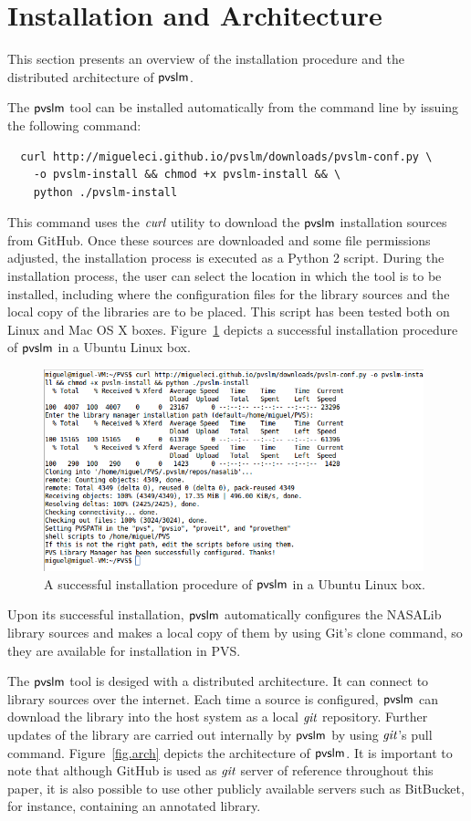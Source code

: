 \section{Installation and Architecture}
\label{sec.install}

This section presents an overview of the installation procedure and
the distributed architecture of $\textsf{pvslm}$.

The $\textsf{pvslm}$ tool can be installed automatically from the command line
by issuing the following command:
%
\begin{verbatim}
  curl http://migueleci.github.io/pvslm/downloads/pvslm-conf.py \
    -o pvslm-install && chmod +x pvslm-install && \
    python ./pvslm-install
\end{verbatim}
%
This command uses the $\textit{curl}$ utility to download the $\textsf{pvslm}$
installation sources from GitHub. Once these sources are downloaded
and some file permissions adjusted, the installation process is
executed as a Python 2 script. During the installation process, the
user can select the location in which the tool is to be installed,
including where the configuration files for the library sources and
the local copy of the libraries are to be placed. This script has been
tested both on Linux and Mac OS X boxes. Figure~\ref{fig.install}
depicts a successful installation procedure of $\textsf{pvslm}$ in a Ubuntu
Linux box.

\begin{figure}
  \centering
  \includegraphics[width=11cm]{images/install.png}
  \caption{A successful installation procedure of $\textsf{pvslm}$ in a Ubuntu
    Linux box.}
  \label{fig.install}
\end{figure}

Upon its successful installation, $\textsf{pvslm}$ automatically configures
the NASALib library sources and makes a local copy of them by using
Git's clone command, so they are available for installation in PVS.

The $\textsf{pvslm}$ tool is desiged with a distributed architecture. It can
connect to library sources over the internet. Each time a source is
configured, $\textsf{pvslm}$ can download the library into the host system as
a local $\textit{git}$ repository. Further updates of the library are carried
out internally by $\textsf{pvslm}$ by using $\textit{git}$'s pull
command. Figure~\ref{fig.arch} depicts the architecture of
$\textsf{pvslm}$. It is important to note that although GitHub is used as
$\textit{git}$ server of reference throughout this paper, it is also possible
to use other publicly available servers such as BitBucket, for
instance, containing an annotated library.

